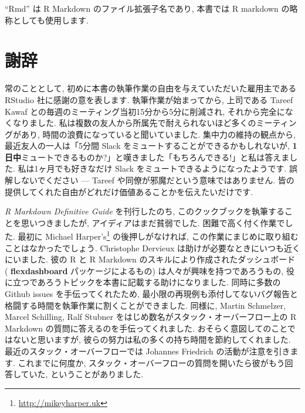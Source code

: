 \documentclass[
  11pt,
]{bxjsreport}
\renewcommand{\href}[2]{#2\footnote{\url{#1}}}
\begin{document}
``Rmd'' は R Markdown のファイル拡張子名であり, 本書では R markdown の略称としても使用します.

\hypertarget{acknowledgments}{%
\section*{謝辞}\label{acknowledgments}}

常のこととして, 初めに本書の執筆作業の自由を与えていただいた雇用主である RStudio 社に感謝の意を表します. 執筆作業が始まってから, 上司である Tareef Kawaf との毎週のミーティング当初15分から5分に削減され, それから完全になくなりました. 私は複数の友人から所属先で耐えられないほど多くのミーティングがあり, 時間の浪費になっていると聞いていました. 集中力の維持の観点から, 最近友人の一人は「5分間 Slack をミュートすることができるかもしれないが, \textbf{1日中}ミュートできるものか?」と嘆きました「もちろんできる!」と私は答えました. 私は1ヶ月でも好きなだけ Slack をミュートできるようになったようです. 誤解しないでください --- Tareef や同僚が邪魔だという意味ではありません. 皆の提供してくれた自由がどれだけ価値あることかを伝えたいだけです.

\emph{R Markdown Definitive Guide} を刊行したのち, このクックブックを執筆することを思いつきましたが, アイディアはまだ貧弱でした. 困難で高く付く作業でした. 最初に \href{http://mikeyharper.uk}{Michael Harper's} の後押しがなければ, この作業にまじめに取り組むことはなかったでしょう. Christophe Dervieux は助けが必要なときにいつも近くにいました. 彼の R と R Markdown のスキルにより作成されたダッシュボード ( \textbf{flexdashboard} パッケージによるもの) は人々が興味を持つであろうもの, 役に立つであろうトピックを本書に記載する助けになりました. 同時に多数の Github issues を手伝ってくれたため, 最小限の再現例も添付してないバグ報告と格闘する時間を執筆作業に割くことができました. 同様に, Martin Schmelzer, Marcel Schilling, Ralf Stubner をはじめ数名がスタック・オーバーフロー上の R Markdown の質問に答えるのを手伝ってくれました. おそらく意図してのことではないと思いますが, 彼らの努力は私の多くの持ち時間を節約してくれました. 最近のスタック・オーバーフローでは Johannes Friedrich の活動が注意を引きます. これまでに何度か, スタック・オーバーフローの質問を開いたら彼がもう回答していた, ということがありました.
\end{document}
